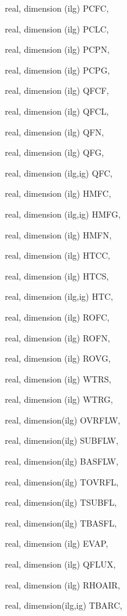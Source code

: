 {\begin{DoxyParamCaption}
\item[{real, dimension  (ilg)}]{P\+C\+F\+C, }
\item[{real, dimension  (ilg)}]{P\+C\+L\+C, }
\item[{real, dimension  (ilg)}]{P\+C\+P\+N, }
\item[{real, dimension  (ilg)}]{P\+C\+P\+G, }
\item[{real, dimension  (ilg)}]{Q\+F\+C\+F, }
\item[{real, dimension  (ilg)}]{Q\+F\+C\+L, }
\item[{real, dimension   (ilg)}]{Q\+F\+N, }
\item[{real, dimension   (ilg)}]{Q\+F\+G, }
\item[{real, dimension  (ilg,ig)}]{Q\+F\+C, }
\item[{real, dimension  (ilg)}]{H\+M\+F\+C, }
\item[{real, dimension (ilg,ig)}]{H\+M\+F\+G, }
\item[{real, dimension  (ilg)}]{H\+M\+F\+N, }
\item[{real, dimension  (ilg)}]{H\+T\+C\+C, }
\item[{real, dimension  (ilg)}]{H\+T\+C\+S, }
\item[{real, dimension  (ilg,ig)}]{H\+T\+C, }
\item[{real, dimension  (ilg)}]{R\+O\+F\+C, }
\item[{real, dimension  (ilg)}]{R\+O\+F\+N, }
\item[{real, dimension  (ilg)}]{R\+O\+V\+G, }
\item[{real, dimension  (ilg)}]{W\+T\+R\+S, }
\item[{real, dimension  (ilg)}]{W\+T\+R\+G, }
\item[{real, dimension(ilg)}]{O\+V\+R\+F\+L\+W, }
\item[{real, dimension(ilg)}]{S\+U\+B\+F\+L\+W, }
\item[{real, dimension(ilg)}]{B\+A\+S\+F\+L\+W, }
\item[{real, dimension(ilg)}]{T\+O\+V\+R\+F\+L, }
\item[{real, dimension(ilg)}]{T\+S\+U\+B\+F\+L, }
\item[{real, dimension(ilg)}]{T\+B\+A\+S\+F\+L, }
\item[{real, dimension  (ilg)}]{E\+V\+A\+P, }
\item[{real, dimension (ilg)}]{Q\+F\+L\+U\+X, }
\item[{real, dimension (ilg)}]{R\+H\+O\+A\+I\+R, }
\item[{real, dimension(ilg,ig)}]{T\+B\+A\+R\+C, }

\end{DoxyParamCaption}}

